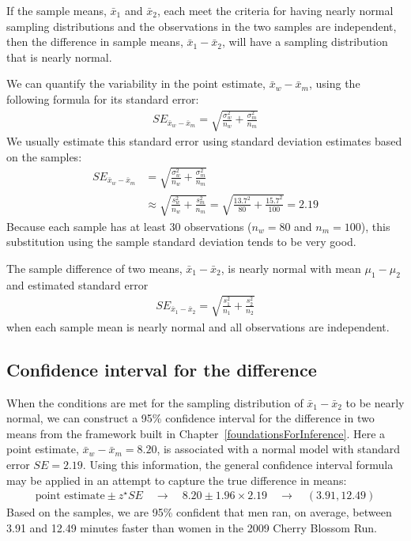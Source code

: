 \begin{termBox}{
If the sample means, $\bar{x}_1$ and $\bar{x}_2$, each meet the criteria for having nearly normal sampling distributions and the observations in the two samples are independent, then the difference in sample means, $\bar{x}_1 - \bar{x}_2$, will have a sampling distribution that is nearly normal.}
\end{termBox}

We can quantify the variability in the point estimate, $\bar{x}_{w} - \bar{x}_{m}$, using the following formula for its standard error:
\begin{eqnarray*}
SE_{\bar{x}_{w} - \bar{x}_{m}} = \sqrt{\frac{\sigma_{w}^2}{n_{w}} + \frac{\sigma_{m}^2}{n_{m}}}
\end{eqnarray*}
We usually estimate this standard error using standard deviation estimates  based on the samples:
\begin{align*}
SE_{\bar{x}_{w} - \bar{x}_{m}}
	&= \sqrt{\frac{\sigma_{w}^2}{n_{w}} + \frac{\sigma_{m}^2}{n_{m}}} \\
	&\approx \sqrt{\frac{s_{w}^2}{n_{w}} + \frac{s_{m}^2}{n_{m}}}
	= \sqrt{\frac{13.7^2}{80} + \frac{15.7^2}{100}} = 2.19
\end{align*}
Because each sample has at least 30 observations ($n_{w} = 80$ and $n_{m} = 100$), this substitution using the sample standard deviation tends to be very good.

\begin{termBox}{
The sample difference of two means, $\bar{x}_1 - \bar{x}_2$, is nearly normal with mean $\mu_{1}-\mu_{2}$ and estimated standard error
\begin{eqnarray}
\textstyle
SE_{\bar{x}_{1} - \bar{x}_{2}} = \sqrt{\frac{s_1^2}{n_1} + \frac{s_2^2}{n_2}}
\label{seOfDifferenceInMeans}
\end{eqnarray}
when each sample mean is nearly normal and all observations are independent.}
\end{termBox}

\subsection{Confidence interval for the difference}

When the conditions are met for the sampling distribution of $\bar{x}_{1} - \bar{x}_{2}$ to be nearly normal, we can construct a 95\% confidence interval for the difference in two means from the framework built in Chapter~\ref{foundationsForInference}. Here a point estimate, $\bar{x}_{w} - \bar{x}_{m} = 8.20$, is associated with a normal model with standard error $SE=2.19$. Using this information, the general confidence interval formula may be applied in an attempt to capture the true difference in means:
\begin{eqnarray*}
\text{point estimate} \pm z^{\star}SE \quad\to\quad 8.20 \pm 1.96\times 2.19 \quad\to\quad (3.91, 12.49)
\end{eqnarray*}
Based on the samples, we are 95\% confident that men ran, on average, between 3.91 and 12.49 minutes faster than women in the 2009 Cherry Blossom Run.

